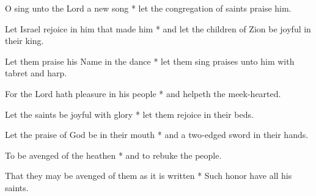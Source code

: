 O sing unto the Lord a new song * let the congregation of saints praise him.

Let Israel rejoice in him that made him * and let the children of Zion be joyful in their king.

Let them praise his Name in the dance * let them sing praises unto him with tabret and harp.

For the Lord hath pleasure in his people * and helpeth the meek-hearted.

Let the saints be joyful with glory * let them rejoice in their beds.

Let the praise of God be in their mouth * and a two-edged sword in their hands.

To be avenged of the heathen * and to rebuke the people.

That they may be avenged of them as it is written * Such honor have all his saints.